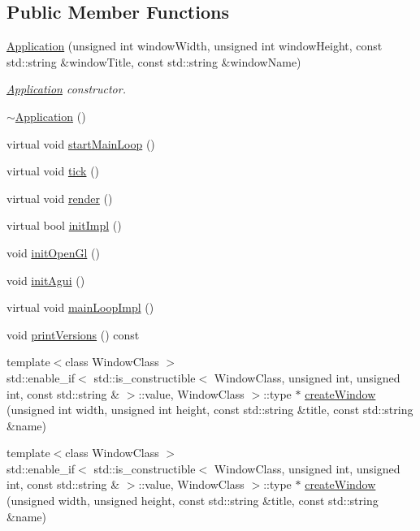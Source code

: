 \subsection*{Public Member Functions}
\begin{DoxyCompactItemize}
\item 
\mbox{\hyperlink{classec_1_1_application_af4a94888105d739a2de75be17ce9ad67}{Application}} (unsigned int window\+Width, unsigned int window\+Height, const std\+::string \&window\+Title, const std\+::string \&window\+Name)
\begin{DoxyCompactList}\small\item\em \mbox{\hyperlink{classec_1_1_application}{Application}} constructor. \end{DoxyCompactList}\item 
\mbox{\hyperlink{classec_1_1_application_abe00fd469062e9710bfda9f9d13765f3}{$\sim$\+Application}} ()
\item 
virtual void \mbox{\hyperlink{classec_1_1_application_ad541044a8fc0ff8d6c3fc57220109a50}{start\+Main\+Loop}} ()
\item 
virtual void \mbox{\hyperlink{classec_1_1_application_a036ae53bcbf708c7a01deb199feeccdf}{tick}} ()
\item 
virtual void \mbox{\hyperlink{classec_1_1_application_a4fe5dcd06017ba4322eca3adec47e03e}{render}} ()
\item 
virtual bool \mbox{\hyperlink{classec_1_1_application_a1460d7083c312271285747a7cc03f7e8}{init\+Impl}} ()
\item 
void \mbox{\hyperlink{classec_1_1_application_a8d6ef43e247b541017fa82e001c42995}{init\+Open\+Gl}} ()
\item 
void \mbox{\hyperlink{classec_1_1_application_a970bf73d58fbf89647125267d5c54a73}{init\+Agui}} ()
\item 
virtual void \mbox{\hyperlink{classec_1_1_application_ad32692a6e65a00346ab2992eba3a86e7}{main\+Loop\+Impl}} ()
\item 
void \mbox{\hyperlink{classec_1_1_application_a6a04a15ddb8e4e2f15d40b6ddb92455e}{print\+Versions}} () const
\item 
{\footnotesize template$<$class Window\+Class $>$ }\\std\+::enable\+\_\+if$<$ std\+::is\+\_\+constructible$<$ Window\+Class, unsigned int, unsigned int, const std\+::string \& $>$\+::value, Window\+Class $>$\+::type $\ast$ \mbox{\hyperlink{classec_1_1_application_a465270af2a0bb6d34b813683bacfa808}{create\+Window}} (unsigned int width, unsigned int height, const std\+::string \&title, const std\+::string \&name)
\item 
{\footnotesize template$<$class Window\+Class $>$ }\\std\+::enable\+\_\+if$<$ std\+::is\+\_\+constructible$<$ Window\+Class, unsigned int, unsigned int, const std\+::string \& $>$\+::value, Window\+Class $>$\+::type $\ast$ \mbox{\hyperlink{classec_1_1_application_ae8227078a50aca68da1a340656c52579}{create\+Window}} (unsigned width, unsigned height, const std\+::string \&title, const std\+::string \&name)
\end{DoxyCompactItemize}


